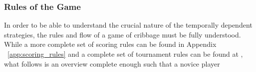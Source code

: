 
\subsubsection{Rules of the Game}

In order to be able to understand the crucial nature of the temporally dependent
strategies, the rules and flow of a game of cribbage must be fully understood.
%
While a more complete set of scoring rules can be found in Appendix
~\ref{app:scoring_rules} and a complete set of tournament rules can be found
at \cite{ACC_rules},
what follows is an overview complete enough such that a novice player 
